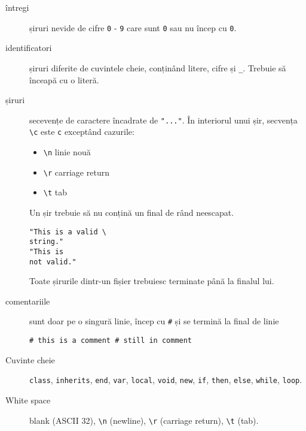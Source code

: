 \documentclass[12pt]{article}
\begin{document}
\begin{description}
	\item[întregi] șiruri nevide de cifre \texttt{0} - \texttt{9} care sunt \texttt{0} sau nu încep cu \texttt{0}.
    
    \item[identificatori] șiruri diferite de cuvintele cheie, conținând litere, cifre și \texttt{\_}. Trebuie să înceapă cu o literă.
    
    \item[șiruri] secevențe de caractere încadrate de \texttt{"..."}. În interiorul unui șir, secvența \texttt{\textbackslash c} este \texttt{c} exceptând cazurile:
    \begin{itemize}
    	\item \texttt{\textbackslash n} linie nouă
    	\item \texttt{\textbackslash r} carriage return
    	\item \texttt{\textbackslash t} tab
    \end{itemize}
    
    Un șir trebuie să nu conțină un final de rând neescapat.
    
\begin{verbatim}
"This is a valid \
string."
"This is
not valid."
\end{verbatim}
    
    Toate șirurile dintr-un fișier trebuiesc terminate până la finalul lui.
    
    \item[comentariile] sunt doar pe o singură linie, încep cu \texttt{\#} și se termină la final de linie
        
\begin{verbatim}
# this is a comment # still in comment
\end{verbatim}

    \item[Cuvinte cheie] \texttt{class}, \texttt{inherits}, \texttt{end}, \texttt{var}, \texttt{local}, \texttt{void}, \texttt{new}, \texttt{if}, \texttt{then}, \texttt{else}, \texttt{while}, \texttt{loop}.
    
    \item[White space] blank (ASCII 32), \texttt{\textbackslash n} (newline), \texttt{\textbackslash r} (carriage return), \texttt{\textbackslash t} (tab).
\end{description}
\end{document}
